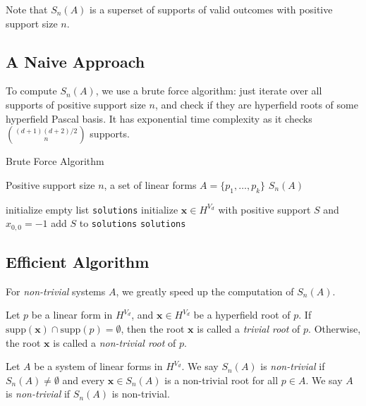 \vspace{0.3cm}

Note that $S_{n}(A)$ is a superset of supports of valid outcomes with positive support size $n$.

\subsection*{A Naive Approach}

To compute $S_{n}(A)$, we use a brute force algorithm: just iterate over all supports of positive support size $n$, and check if they are hyperfield roots of some hyperfield Pascal basis. It has exponential time complexity as it checks \( \binom{(d+1)(d+2)/2}{n} \) supports.

\begin{algorithm}
\caption{Brute Force Algorithm}\label{alg:hyperfield_criterion:brute_force}
    \begin{algorithmic}[1]
    \Require Positive support size $n$, a set of linear forms $A = \{ p_{1}, \dots, p_{k} \}$
    \Ensure $S_{n}(A)$

    \State initialize empty list \texttt{solutions}
        \State initialize $\mathbf{x} \in H^{V_{d}}$ with positive support $S$ and $x_{0,0} = -1$ 
        \State add $S$ to \texttt{solutions}
        \EndIf
    \EndFor
    \State \Return \texttt{solutions}
    \EndFunction
    \end{algorithmic}  
\end{algorithm}

\subsection*{Efficient Algorithm}

For \emph{non-trivial} systems \( A \), we greatly speed up the computation of $S_{n}(A)$.


\begin{definition}
    Let $p$ be a linear form in \( H^{V_d} \), and $\mathbf{x} \in {H}^{V_d}$ be a hyperfield root of $p$. If $\mathrm{supp}(\mathbf{x}) \cap \mathrm{supp}(p) = \emptyset$, then the root $\mathbf{x}$ is called a \emph{trivial root} of $p$. Otherwise, the root $\mathbf{x}$ is called a \emph{non-trivial root} of $p$.
\end{definition}

\begin{definition}
    Let $A$ be a system of linear forms in \( H^{V_d} \). We say $S_{n}(A)$ is \emph{non-trivial} if $S_{n}(A) \neq \emptyset$ and every $\mathbf{x} \in S_{n}(A)$ is a non-trivial root for all $p \in A$. We say $A$ is \emph{non-trivial} if $S_{n}(A)$ is non-trivial.
\end{definition}
  
